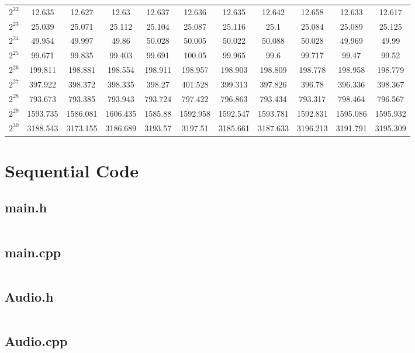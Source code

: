 \begin{center}
\begin{landscape}
\begin{tabular}{c|c|c|c|c|c|c|c|c|c|c}
$2^{22}$ & 12.635 & 12.627 & 12.63 & 12.637 & 12.636 & 12.635 & 12.642 & 12.658 & 12.633 & 12.617 \\ 
$2^{23}$ & 25.039 & 25.071 & 25.112 & 25.104 & 25.087 & 25.116 & 25.1 & 25.084 & 25.089 & 25.125 \\ 
$2^{24}$ & 49.954 & 49.997 & 49.86 & 50.028 & 50.005 & 50.022 & 50.088 & 50.028 & 49.969 & 49.99 \\ 
$2^{25}$ & 99.671 & 99.835 & 99.403 & 99.691 & 100.05 & 99.965 & 99.6 & 99.717 & 99.47 & 99.52 \\ 
$2^{26}$ & 199.811 & 198.881 & 198.554 & 198.911 & 198.957 & 198.903 & 198.809 & 198.778 & 198.958 & 198.779 \\ 
$2^{27}$ & 397.922 & 398.372 & 398.335 & 398.27 & 401.528 & 399.313 & 397.826 & 396.78 & 396.336 & 398.367 \\ 
$2^{28}$ & 793.673 & 793.385 & 793.943 & 793.724 & 797.422 & 796.863 & 793.434 & 793.317 & 798.464 & 796.567 \\ 
$2^{29}$ & 1593.735 & 1586.081 & 1606.435 & 1585.88 & 1592.958 & 1592.547 & 1593.781 & 1592.831 & 1595.086 & 1595.932 \\ 
$2^{30}$ & 3188.543 & 3173.155 & 3186.689 & 3193.57 & 3197.51 & 3185.661 & 3187.633 & 3196.213 & 3191.791 & 3195.309 \\ 
\end{tabular}
\end{landscape}
\end{center}

\section{Sequential Code}
\subsection{main.h}
\inputminted[breaklines, breakanywhere]{cpp}{CPUsrc/main.h}
\subsection{main.cpp}
\inputminted[breaklines, breakanywhere]{cpp}{CPUsrc/main.cpp}
\subsection{Audio.h}
\inputminted[breaklines, breakanywhere]{cpp}{CPUsrc/Audio.h}
\subsection{Audio.cpp}
\inputminted[breaklines, breakanywhere]{cpp}{CPUsrc/Audio.cpp}
